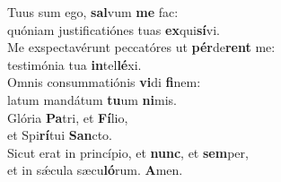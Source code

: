 \evenverse Tuus sum ego, \textbf{sal}vum \textbf{me} fac:~\*\\
\evenverse quóniam justificatiónes tuas \textbf{ex}qui\textbf{sí}vi.\\
\oddverse Me exspectavérunt peccatóres ut \textbf{pér}de\textbf{rent} me:~\*\\
\oddverse testimónia tua \textbf{in}tel\textbf{lé}xi.\\
\evenverse Omnis consummatiónis \textbf{vi}di \textbf{fi}nem:~\*\\
\evenverse latum mandátum \textbf{tu}um \textbf{ni}mis.\\
\oddverse Glória \textbf{Pa}tri, et \textbf{Fí}lio,~\*\\
\oddverse et Spi\textbf{rí}tui \textbf{San}cto.\\
\evenverse Sicut erat in princípio, et \textbf{nunc}, et \textbf{sem}per,~\*\\
\evenverse et in sǽcula sæcu\textbf{ló}rum. \textbf{A}men.\\
